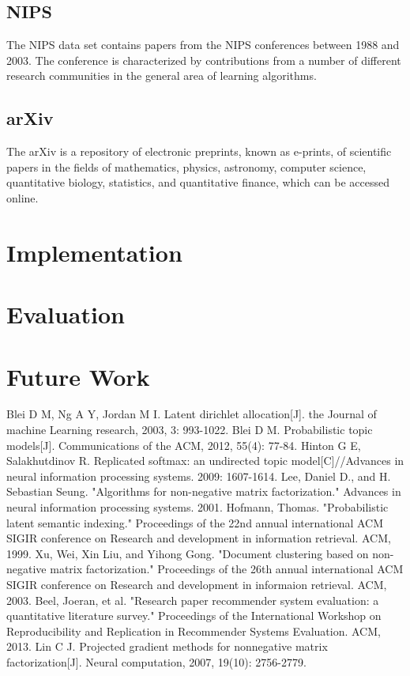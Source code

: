 \documentclass[10pt]{article}
\begin{document}
\subsection{NIPS}
The NIPS data set contains papers from the NIPS conferences between 1988 and 2003. The conference is characterized by contributions from a number of different research communities in the general area of learning algorithms.
\subsection{arXiv}
The arXiv is a repository of electronic preprints, known as e-prints, of scientific papers in the fields of mathematics, physics, astronomy, computer science, quantitative biology, statistics, and quantitative finance, which can be accessed online.
\section{Implementation}

\section{Evaluation}

\section{Future Work}

\begin{thebibliography}{9}
 Blei D M, Ng A Y, Jordan M I. Latent dirichlet allocation[J]. the Journal of machine Learning research, 2003, 3: 993-1022.
 Blei D M. Probabilistic topic models[J]. Communications of the ACM, 2012, 55(4): 77-84.
 Hinton G E, Salakhutdinov R. Replicated softmax: an undirected topic model[C]//Advances in neural information processing systems. 2009: 1607-1614.
 Lee, Daniel D., and H. Sebastian Seung. "Algorithms for non-negative matrix factorization." Advances in neural information processing systems. 2001.
 Hofmann, Thomas. "Probabilistic latent semantic indexing." Proceedings of the 22nd annual international ACM SIGIR conference on Research and development in information retrieval. ACM, 1999.
 Xu, Wei, Xin Liu, and Yihong Gong. "Document clustering based on non-negative matrix factorization." Proceedings of the 26th annual international ACM SIGIR conference on Research and development in informaion retrieval. ACM, 2003.
 Beel, Joeran, et al. "Research paper recommender system evaluation: a quantitative literature survey." Proceedings of the International Workshop on Reproducibility and Replication in Recommender Systems Evaluation. ACM, 2013.
 Lin C J. Projected gradient methods for nonnegative matrix factorization[J]. Neural computation, 2007, 19(10): 2756-2779.
\end{thebibliography}
\end{document}
